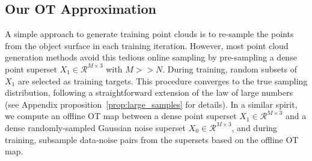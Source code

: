 \vspace{-2mm}
\subsection{Our OT Approximation}
\label{subsec:ot_approx}
\vspace{-2mm}


%
A simple approach to generate training point clouds is to re-sample the points from the object surface in each training iteration.
However, most point cloud generation methods avoid this tedious online sampling by pre-sampling a dense point superset $X_1 \in \mathcal{R}^{M \times 3}$ with $M >> N$.
During training, random subsets of $X_1$ are selected as training targets. %
This procedure converges to the true sampling distribution, following a straightforward extension of the law of large numbers (see Appendix proposition~\ref{prop:large_samples} for details).
In a similar spirit, %
%
we compute an offline OT map between a dense point superset $X_1 \in \mathcal{R}^{M \times 3}$ and a dense randomly-sampled Gaussian noise superset $X_0 \in \mathcal{R}^{M \times 3}$, and during training, subsample data-noise pairs from the supersets based on the offline OT map.

